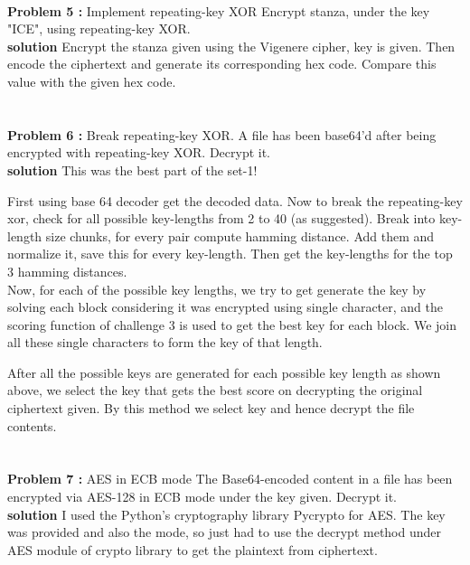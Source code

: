 \documentclass[12pt]{assignment}
\begin{document}
    \\

    \textbf{Problem 5 :}
    Implement repeating-key XOR
    Encrypt stanza, under the key "ICE", using repeating-key XOR.\\
    
    
    \textbf{solution}
    Encrypt the stanza given using the Vigenere cipher, key is given. Then encode the ciphertext and generate its corresponding hex code. Compare this value with the given hex code.\\\\
    

    \\

    \textbf{Problem 6 :}
    Break repeating-key XOR.
    A file has been base64'd after being encrypted with repeating-key XOR.
	Decrypt it.\\
    
    
    \textbf{solution}
    This was the best part of the set-1!

    First using base 64 decoder get the decoded data.
    Now to break the repeating-key xor, check for all possible key-lengths from 2 to 40 (as suggested). Break into key-length size chunks, for every pair compute hamming distance. Add them and normalize it, save this for every key-length. Then get the key-lengths for the top 3 hamming distances.\\

    Now, for each of the possible key lengths, we try to get generate the key by solving each block considering it was encrypted using single character, and the scoring function of challenge 3 is used to get the best key for each block. We join all these single characters to form the key of that length.

    After all the possible keys are generated for each possible key length as shown above, we select the key that gets the best score on decrypting the original ciphertext given. By this method we select key and hence decrypt the file contents.\\\\


    \\

    \textbf{Problem 7 :}
    AES in ECB mode
    The Base64-encoded content in a file has been encrypted via AES-128 in ECB mode under the key given. Decrypt it.\\
    
    
    \textbf{solution}
    I used the Python's cryptography library Pycrypto for AES. The key was provided and also the mode, so just had to use the decrypt method under AES module of crypto library to get the plaintext from ciphertext.\\\\
    
\end{document}
